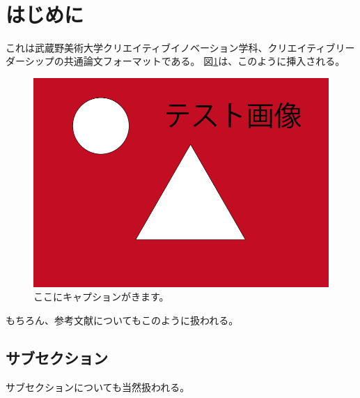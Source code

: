 \documentclass[a4paper,11truept, titlepage]{jlreq}
\begin{document}
\maketitle
{}　%

\section{はじめに}
これは武蔵野美術大学クリエイティブイノベーション学科、クリエイティブリーダーシップの共通論文フォーマットである。
図\ref{abstract}は、このように挿入される。
\begin{figure}
    \centering
	\includegraphics[clip, width=\columnwidth]{Images/test.png}
    \caption{ここにキャプションがきます。}
    \label{abstract}
\end{figure}

もちろん、参考文献についてもこのように扱われる。\citep{bib1}

\subsection{サブセクション}
サブセクションについても当然扱われる。

\small


\end{document}
